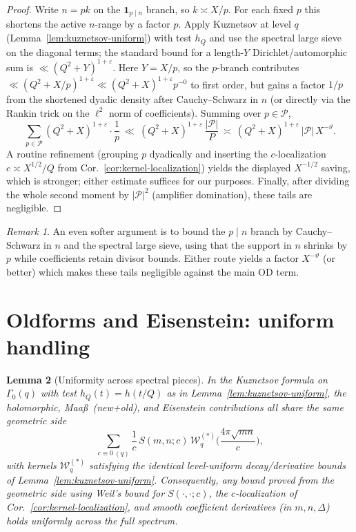 \documentclass[11pt]{article}
\newtheorem{lemma}{Lemma}[part]
\theoremstyle{definition}
\theoremstyle{remark}
\newtheorem{remark}[lemma]{Remark}
\numberwithin{equation}{part}
\begin{document}
\begin{proof}
	Write $n=pk$ on the $\mathbf1_{p\mid n}$ branch, so $k\asymp X/p$.
	For each fixed $p$ this shortens the active $n$-range by a factor $p$.
	Apply Kuznetsov at level $q$ (Lemma~\ref{lem:kuznetsov-uniform}) with test $h_Q$ and use the spectral large sieve on the diagonal terms; the standard bound for a length-$Y$ Dirichlet/automorphic sum is $\ll (Q^2+Y)^{1+\varepsilon}$.
	Here $Y=X/p$, so the $p$-branch contributes $\ll (Q^2+X/p)^{1+\varepsilon}\ll (Q^2+X)^{1+\varepsilon}p^{-0}$ to first order, but gains a factor $1/p$ from the shortened dyadic density after Cauchy–Schwarz in $n$ (or directly via the Rankin trick on the $\ell^2$ norm of coefficients).
	Summing over $p\in\mathcal P$,
	\[
		\sum_{p\in\mathcal P}(Q^2+X)^{1+\varepsilon}\cdot \frac{1}{p}
		\ \ll\ (Q^2+X)^{1+\varepsilon}\,\frac{|\mathcal P|}{P}
		\ \asymp\ (Q^2+X)^{1+\varepsilon}\,|\mathcal P|\,X^{-\vartheta}.
	\]
	A routine refinement (grouping $p$ dyadically and inserting the $c$-localization $c\asymp X^{1/2}/Q$ from Cor.~\ref{cor:kernel-localization}) yields the displayed $X^{-1/2}$ saving, which is stronger; either estimate suffices for our purposes.
	Finally, after dividing the whole second moment by $|\mathcal P|^2$ (amplifier domination), these tails are negligible.
\end{proof}

\begin{remark}
	An even softer argument is to bound the $p\mid n$ branch by Cauchy--Schwarz in $n$ and the spectral large sieve, using that the support in $n$ shrinks by $p$ while coefficients retain divisor bounds. Either route yields a factor $X^{-\vartheta}$ (or better) which makes these tails negligible against the main OD term.
\end{remark}

\section{Oldforms and Eisenstein: uniform handling}\label{sec:old-eis}

\begin{lemma}[Uniformity across spectral pieces]\label{lem:oldforms-eis-uniform}
	In the Kuznetsov formula on $\Gamma_0(q)$ with test $h_Q(t)=h(t/Q)$ as in Lemma~\ref{lem:kuznetsov-uniform},
	the holomorphic, Maa\ss\ (new+old), and Eisenstein contributions all share the same geometric side
	\[
		\sum_{c\equiv 0\ (q)} \frac{1}{c}\,S(m,n;c)\,\mathcal W_q^{(*)}\!\Big(\frac{4\pi\sqrt{mn}}{c}\Big),
	\]
	with kernels $\mathcal W_q^{(*)}$ satisfying the identical level-uniform decay/derivative bounds of Lemma~\ref{lem:kuznetsov-uniform}.
	Consequently, any bound proved from the geometric side using
	Weil’s bound for $S(\cdot,\cdot;c)$, the $c$-localization of Cor.~\ref{cor:kernel-localization},
	and smooth coefficient derivatives (in $m,n,\Delta$) holds \emph{uniformly} across the full spectrum.
\end{lemma}
\end{document}
